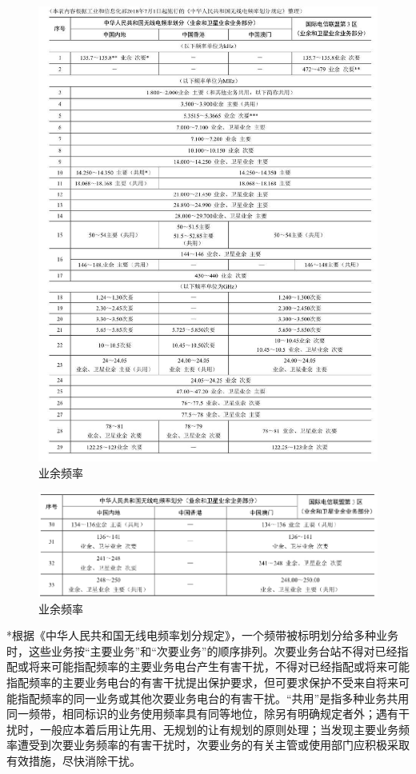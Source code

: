 \documentclass[12pt,UTF8]{ctexbook}
\begin{document}
\begin{figure}[htbp]
	\centering
	\includegraphics[width=0.7\linewidth]{80}
	\caption{业余频率}
	\label{fig:1}
\end{figure}

\begin{figure}[htbp]
	\centering
	\includegraphics[width=0.7\linewidth]{81}
	\caption{业余频率}
	\label{fig:1}
\end{figure}

*根据《中华人民共和国无线电频率划分规定》，一个频带被标明划分给多种业务时，这些业务按“主要业务”和“次要业务”的顺序排列。次要业务台站不得对已经指配或将来可能指配频率的主要业务电台产生有害干扰，不得对已经指配或将来可能指配频率的主要业务电台的有害干扰提出保护要求，但可要求保护不受来自将来可能指配频率的同一业务或其他次要业务电台的有害干扰。“共用”是指多种业务共用同一频带，相同标识的业务使用频率具有同等地位，除另有明确规定者外；遇有干扰时，一般应本着后用让先用、无规划的让有规划的原则处理；当发现主要业务频率遭受到次要业务频率的有害干扰时，次要业务的有关主管或使用部门应积极采取有效措施，尽快消除干扰。
\end{document}
